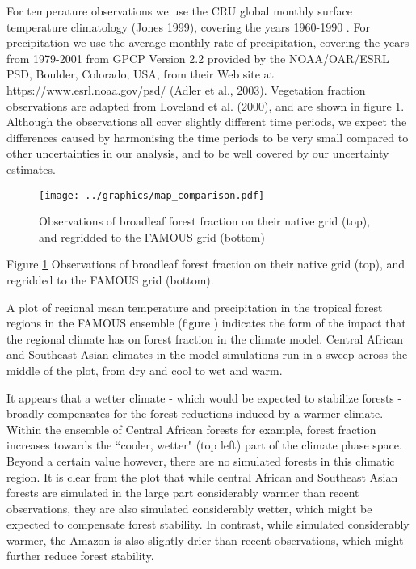 \documentclass[gmd, manuscript]{copernicus}
\begin{document}
For temperature observations we use the CRU global monthly surface temperature climatology (Jones 1999), covering the years 1960-1990 . For precipitation we use the average monthly rate of precipitation, covering the years from 1979-2001 from GPCP Version 2.2 provided by the NOAA/OAR/ESRL PSD, Boulder, Colorado, USA, from their Web site at https://www.esrl.noaa.gov/psd/ (Adler et al., 2003). Vegetation fraction observations are adapted from Loveland et al. (2000), and are shown in figure \ref{fig:map_comparison}. Although the observations all cover slightly different time periods, we expect the differences caused by harmonising the time periods to be very small compared to other uncertainties in our analysis, and to be well covered by our uncertainty estimates.


\begin{figure}[t]
\texttt{[image: ../graphics/map\_comparison.pdf]}
\caption{Observations of broadleaf forest fraction on their native grid (top), and regridded to the FAMOUS grid (bottom)}
\label{fig:map_comparison}
\end{figure}

Figure \ref{fig:map_comparison} Observations of broadleaf forest fraction on their native grid (top), and regridded to the FAMOUS grid (bottom).

A plot of regional mean temperature and precipitation in the tropical forest regions in the FAMOUS ensemble (figure \cite{fig:fraction_vs_temp_precip_pcolcor}) indicates the form of the impact that the regional climate has on forest fraction in the climate model. Central African and Southeast Asian climates in the model simulations run in a sweep across the middle of the plot, from dry and cool to wet and warm. 

It appears that a wetter climate - which would be expected to stabilize forests - broadly compensates for the forest reductions induced by a warmer climate. Within the ensemble of Central African forests for example, forest fraction increases towards the ``cooler, wetter" (top left) part of the climate phase space. Beyond a certain value however, there are no simulated forests in this climatic region. It is clear from the plot that while central African and Southeast Asian forests are simulated in the large part considerably warmer than recent observations, they are also simulated considerably wetter, which might be expected to compensate forest stability. In contrast, while simulated considerably warmer, the Amazon is also slightly drier than recent observations, which might further reduce forest stability.
\end{document}

